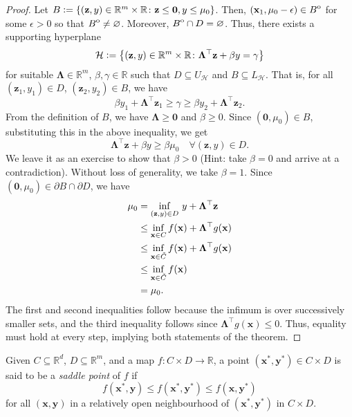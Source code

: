 \begin{proof}
    Let $B \vcentcolon= \left\{ (\mathbf{z}, y) \in \mathbb{R}^m \times \mathbb{R} \colon \mathbf{z} \leq \mathbf{0}, y \leq \mu_0 \right\}$. Then, $(\mathbf{x}_1, \mu_0 - \epsilon) \in {\kern0ptB}^{\mathrm{o}}$ for some $\epsilon > 0$ so that ${\kern0ptB}^{\mathrm{o}} \neq \varnothing$. Moreover, ${\kern0ptB}^{\mathrm{o}} \cap D = \varnothing$. Thus, there exists a supporting hyperplane
    \[
        \mathcal{H} \vcentcolon= \left\{ (\mathbf{z}, y) \in \mathbb{R}^m \times \mathbb{R} \colon \bm{\Lambda}^{\top}\mathbf{z} + \beta y = \gamma \right\}
    \]
    for suitable $\bm{\Lambda} \in \mathbb{R}^m$, $\beta, \gamma \in \mathbb{R}$ such that $D \subseteq U_{\mathcal{H}}$ and $B \subseteq L_{\mathcal{H}}$. That is, for all $(\mathbf{z}_1, y_1) \in D$, $(\mathbf{z}_2, y_2) \in B$, we have
    \[
        \beta y_1 + \bm{\Lambda}^{\top} \mathbf{z}_1 \geq \gamma \geq \beta y_2 + \bm{\Lambda}^{\top} \mathbf{z}_2.
    \]
    From the definition of $B$, we have $\bm{\Lambda} \geq \mathbf{0}$ and $\beta \geq 0$. Since $(\mathbf{0}, \mu_0) \in B$, substituting this in the above inequality, we get
    \[
        \bm{\Lambda}^{\top}\mathbf{z} + \beta y \geq \beta \mu_0 \quad \forall (\mathbf{z}, y) \in D.
    \]
    We leave it as an exercise to show that $\beta > 0$ (Hint: take $\beta = 0$ and arrive at a contradiction). Without loss of generality, we take $\beta = 1$. Since $(\mathbf{0}, \mu_0) \in \partial B \cap \partial D$, we have
    \begin{align*}
        \mu_0 &= \inf_{(\mathbf{z}, y) \in D} \, y + \bm{\Lambda}^{\top}\mathbf{z} \\
        &\leq \inf_{\mathbf{x} \in C} f(\mathbf{x}) + \bm{\Lambda}^{\top} g(\mathbf{x}) \\
        &\leq \inf_{\mathbf{x} \in \Tilde{C}} f(\mathbf{x}) + \bm{\Lambda}^{\top} g(\mathbf{x}) \\
        &\leq \inf_{\mathbf{x} \in \Tilde{C}} f(\mathbf{x}) \\
        &= \mu_0.
    \end{align*}
    The first and second inequalities follow because the infimum is over successively smaller sets, and the third inequality follows since $\bm{\Lambda}^{\top} g(\mathbf{x}) \leq 0$. Thus, equality must hold at every step, implying both statements of the theorem. 
\end{proof}

\begin{defn}
    Given $C \subseteq \mathbb{R}^d$, $D \subseteq \mathbb{R}^m$, and a map $f \colon C \times D \to \mathbb{R}$, a point $(\mathbf{x}^*, \mathbf{y}^*) \in C \times D$ is said to be a \emph{saddle point} of $f$ if
    \[
        f(\mathbf{x}^*, \mathbf{y}) \leq f(\mathbf{x}^*, \mathbf{y}^*) \leq f(\mathbf{x}, \mathbf{y}^*)
    \]
    for all $(\mathbf{x}, \mathbf{y})$ in a relatively open neighbourhood of $(\mathbf{x}^*, \mathbf{y}^*)$ in $C \times D$. 
\end{defn}

